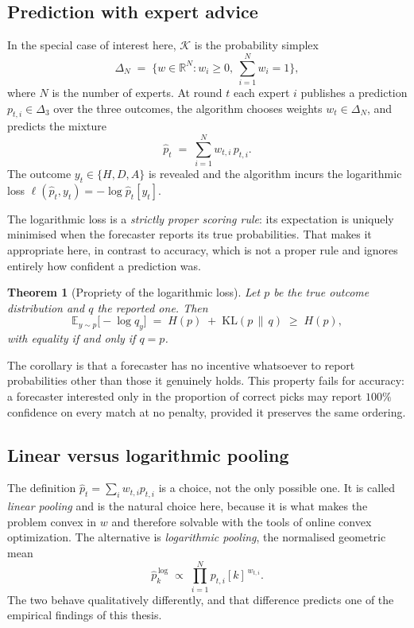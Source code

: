 \documentclass[12pt,a4paper,oneside]{report}
\renewcommand{\_}{\oldunderscore\allowbreak}
\theoremstyle{definition}
\theoremstyle{plain}
\newtheorem{theorem}{Theorem}[chapter]
\theoremstyle{remark}
\begin{document}
\subsection{Prediction with expert advice}

In the special case of interest here, $\mathcal{K}$ is the probability simplex
\[
\Delta_N \;=\; \Big\{ w \in \mathbb{R}^N : w_i \geq 0,\ \textstyle\sum_{i=1}^{N} w_i = 1 \Big\},
\]
where $N$ is the number of experts. At round $t$ each expert $i$ publishes a prediction
$p_{t,i} \in \Delta_3$ over the three outcomes, the algorithm chooses weights
$w_t \in \Delta_N$, and predicts the mixture
\[
\hat{p}_t \;=\; \sum_{i=1}^{N} w_{t,i}\, p_{t,i}.
\]
The outcome $y_t \in \{H,D,A\}$ is revealed and the algorithm incurs the logarithmic loss
$\ell(\hat{p}_t, y_t) = -\log \hat{p}_{t}[y_t]$.

The logarithmic loss is a \emph{strictly proper scoring rule}: its expectation is uniquely
minimised when the forecaster reports its true probabilities. That makes it appropriate here,
in contrast to accuracy, which is not a proper rule and ignores entirely how confident a
prediction was.

\begin{theorem}[Propriety of the logarithmic loss]
\label{thm:propriety}
Let $p$ be the true outcome distribution and $q$ the reported one. Then
\[
\mathbb{E}_{y\sim p}\big[-\log q_y\big] \;=\; H(p) \;+\; \mathrm{KL}(p \,\|\, q) \;\geq\; H(p),
\]
with equality if and only if $q = p$.
\end{theorem}

The corollary is that a forecaster has no incentive whatsoever to report probabilities other
than those it genuinely holds. This property fails for accuracy: a forecaster interested only
in the proportion of correct picks may report $100\%$ confidence on every match at no penalty,
provided it preserves the same ordering.

\subsection*{Linear versus logarithmic pooling}
\label{sec:pooling}

The definition $\hat{p}_t = \sum_i w_{t,i} p_{t,i}$ is a choice, not the only possible one. It
is called \emph{linear pooling} and is the natural choice here, because it is what makes the
problem convex in $w$ and therefore solvable with the tools of online convex optimization. The
alternative is \emph{logarithmic pooling}, the normalised geometric mean
\[
\hat{p}^{\,\mathrm{log}}_k \;\propto\; \prod_{i=1}^{N} p_{t,i}[k]^{\,w_{t,i}} .
\]
The two behave qualitatively differently, and that difference predicts one of the empirical
findings of this thesis.
\end{document}
